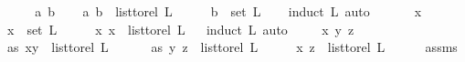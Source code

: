 \begin{isabellebody}
\isanewline
{}\isamarkupfalse%
\ \isanewline
\ \ \isamarkupfalse%
\ a\ b\isanewline
\ \ \isamarkupfalse%
\ {\isachardoublequoteopen}{\isacharparenleft}{\kern0pt}a{\isacharcomma}{\kern0pt}\ b{\isacharparenright}{\kern0pt}\ {\isasymin}\ list{\isacharunderscore}{\kern0pt}to{\isacharunderscore}{\kern0pt}rel\ L{\isachardoublequoteclose}\isanewline
\ \ \isamarkupfalse%
\ \isamarkupfalse%
\ {\isachardoublequoteopen}b\ {\isasymin}\ set\ L{\isachardoublequoteclose}\ \isanewline
\ \ \isamarkupfalse%
{\isacharparenleft}{\kern0pt}induct\ L{\isacharcomma}{\kern0pt}\ auto{\isacharparenright}{\kern0pt}\ \isamarkupfalse%
\isanewline
{}\isamarkupfalse%
\ \isanewline
\ \ \isamarkupfalse%
\ x\ \isanewline
\ \ \isamarkupfalse%
\ {\isachardoublequoteopen}x\ {\isasymin}\ set\ L{\isachardoublequoteclose}\isanewline
\ \ \isamarkupfalse%
\ \isamarkupfalse%
\ {\isachardoublequoteopen}{\isacharparenleft}{\kern0pt}x{\isacharcomma}{\kern0pt}\ x{\isacharparenright}{\kern0pt}\ {\isasymin}\ list{\isacharunderscore}{\kern0pt}to{\isacharunderscore}{\kern0pt}rel\ L{\isachardoublequoteclose}\isanewline
\ \ \isamarkupfalse%
{\isacharparenleft}{\kern0pt}induct\ L{\isacharcomma}{\kern0pt}\ auto{\isacharparenright}{\kern0pt}\ \isamarkupfalse%
\isanewline
{}\isamarkupfalse%
\isanewline
\ \ \isamarkupfalse%
\ x\ y\ z\ \isanewline
\ \ \isamarkupfalse%
\ as{}{\isacharcolon}{\kern0pt}\ {\isachardoublequoteopen}{\isacharparenleft}{\kern0pt}x{\isacharcomma}{\kern0pt}y{\isacharparenright}{\kern0pt}\ {\isasymin}\ list{\isacharunderscore}{\kern0pt}to{\isacharunderscore}{\kern0pt}rel\ L{\isachardoublequoteclose}\isanewline
\ \ \ \ \ \ as{}{\isacharcolon}{\kern0pt}\ {\isachardoublequoteopen}{\isacharparenleft}{\kern0pt}y{\isacharcomma}{\kern0pt}\ z{\isacharparenright}{\kern0pt}\ {\isasymin}\ list{\isacharunderscore}{\kern0pt}to{\isacharunderscore}{\kern0pt}rel\ L{\isachardoublequoteclose}\isanewline
\ \ \isamarkupfalse%
\ \isamarkupfalse%
\ {\isachardoublequoteopen}{\isacharparenleft}{\kern0pt}x{\isacharcomma}{\kern0pt}\ z{\isacharparenright}{\kern0pt}\ {\isasymin}\ list{\isacharunderscore}{\kern0pt}to{\isacharunderscore}{\kern0pt}rel\ L{\isachardoublequoteclose}\isanewline
\ \ \ \ \isamarkupfalse%
\ assms\isanewline
\ \ \isamarkupfalse%

\end{isabellebody}
